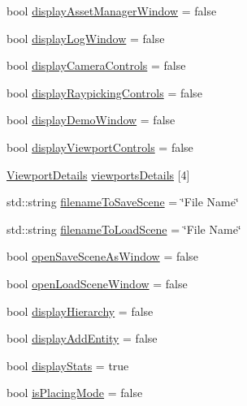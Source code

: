 \begin{DoxyCompactItemize}
\item 
bool \mbox{\hyperlink{classpiolot_1_1_test_scene_a7568d8b6dbe31cdac69303544c06d338}{display\+Asset\+Manager\+Window}} = false
\item 
bool \mbox{\hyperlink{classpiolot_1_1_test_scene_a1abbac46b5984ea191e8f429cd10e626}{display\+Log\+Window}} = false
\item 
bool \mbox{\hyperlink{classpiolot_1_1_test_scene_a91e97c2de25304b754313bd1beceecac}{display\+Camera\+Controls}} = false
\item 
bool \mbox{\hyperlink{classpiolot_1_1_test_scene_aeff84b8ca87f60068340a8a3afbe11e5}{display\+Raypicking\+Controls}} = false
\item 
bool \mbox{\hyperlink{classpiolot_1_1_test_scene_a7416b0c39baa5a3154ac88bda22bdf25}{display\+Demo\+Window}} = false
\item 
bool \mbox{\hyperlink{classpiolot_1_1_test_scene_a5f2a7d4a162916445d89f338c01dbc93}{display\+Viewport\+Controls}} = false
\item 
\mbox{\hyperlink{structpiolot_1_1_viewport_details}{Viewport\+Details}} \mbox{\hyperlink{classpiolot_1_1_test_scene_a0cbccb0354c0c68f277c2360cefc9ab7}{viewports\+Details}} \mbox{[}4\mbox{]}
\item 
std\+::string \mbox{\hyperlink{classpiolot_1_1_test_scene_a9f8ea97b9444b79a962ec590af5761d3}{filename\+To\+Save\+Scene}} = \char`\"{}File Name\char`\"{}
\item 
std\+::string \mbox{\hyperlink{classpiolot_1_1_test_scene_a6dfdaeb3f1711bcca9b85bc5a0a5acd3}{filename\+To\+Load\+Scene}} = \char`\"{}File Name\char`\"{}
\item 
bool \mbox{\hyperlink{classpiolot_1_1_test_scene_a6a9853bb71c428b0842dce2af2976514}{open\+Save\+Scene\+As\+Window}} = false
\item 
bool \mbox{\hyperlink{classpiolot_1_1_test_scene_a29392a8bc16ade36f204bf56fa68cb17}{open\+Load\+Scene\+Window}} = false
\item 
bool \mbox{\hyperlink{classpiolot_1_1_test_scene_ab906d0870595d299b454becf24219171}{display\+Hierarchy}} = false
\item 
bool \mbox{\hyperlink{classpiolot_1_1_test_scene_a4123335b4ec13948ff01ae9f344d9546}{display\+Add\+Entity}} = false
\item 
bool \mbox{\hyperlink{classpiolot_1_1_test_scene_a66ea919cf7e7a7ddf8931eef4c41b841}{display\+Stats}} = true
\item 
bool \mbox{\hyperlink{classpiolot_1_1_test_scene_a426f58e9273e201864ccf3e0e8b342e3}{is\+Placing\+Mode}} = false

\end{DoxyCompactItemize}
